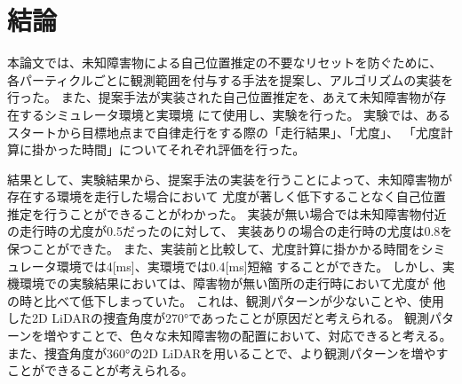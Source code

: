 \chapter{結論}

本論文では、未知障害物による自己位置推定の不要なリセットを防ぐために、
各パーティクルごとに観測範囲を付与する手法を提案し、アルゴリズムの実装を行った。
また、提案手法が実装された自己位置推定を、あえて未知障害物が存在するシミュレータ環境と実環境
にて使用し、実験を行った。
実験では、あるスタートから目標地点まで自律走行をする際の「走行結果」、「尤度」、
「尤度計算に掛かった時間」についてそれぞれ評価を行った。

結果として、実験結果から、提案手法の実装を行うことによって、未知障害物が存在する環境を走行した場合において
尤度が著しく低下することなく自己位置推定を行うことができることがわかった。
実装が無い場合では未知障害物付近の走行時の尤度が0.5だったのに対して、
実装ありの場合の走行時の尤度は0.8を保つことができた。
また、実装前と比較して、尤度計算に掛かかる時間をシミュレータ環境では4[ms]、実環境では0.4[ms]短縮
することができた。
しかし、実機環境での実験結果においては、障害物が無い箇所の走行時において尤度が
他の時と比べて低下しまっていた。
これは、観測パターンが少ないことや、使用した2D LiDARの捜査角度が270°であったことが原因だと考えられる。
観測パターンを増やすことで、色々な未知障害物の配置において、対応できると考える。
また、捜査角度が360°の2D LiDARを用いることで、より観測パターンを増やすことができることが考えられる。
